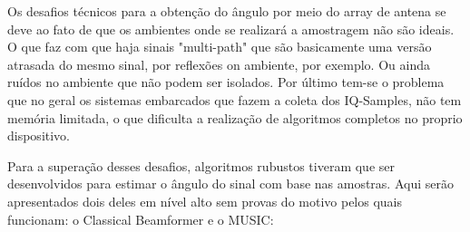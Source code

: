 Os desafios técnicos para a obtenção do ângulo por meio do array de antena se deve ao fato de que os ambientes onde se realizará a amostragem não são ideais. O que faz com que haja sinais "multi-path" que são basicamente uma versão atrasada do mesmo sinal, por reflexões on ambiente, por exemplo. Ou ainda ruídos no ambiente que não podem ser isolados. Por último tem-se o problema que no geral os sistemas embarcados que fazem a coleta dos IQ-Samples, não tem memória limitada, o que dificulta a realização de algoritmos completos no proprio dispositivo.

Para a superação desses desafios, algoritmos rubustos tiveram que ser desenvolvidos para estimar o ângulo do sinal com base nas amostras. Aqui serão apresentados dois deles em nível alto sem provas do motivo pelos quais funcionam: o Classical Beamformer e o MUSIC:

